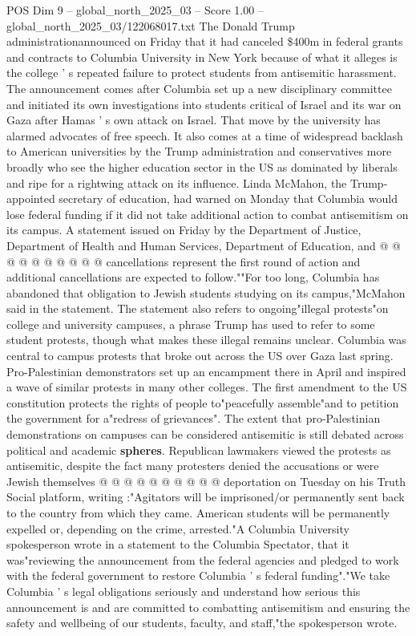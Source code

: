 \begin{textsample}{POS Dim 9 – global\_north\_2025\_03 – Score 1.00 – global\_north\_2025\_03/122068017.txt}  \label{ex:f9_pos_387}
The Donald Trump administrationannounced on Friday that it had canceled \$400m in federal grants and contracts to Columbia University in New York because of what it alleges is the college ' s repeated failure to protect students from antisemitic harassment.
The announcement comes after Columbia set up a new disciplinary committee and initiated its own investigations into students critical of Israel and its war on Gaza after Hamas ' s own attack on Israel.
That move by the university has alarmed advocates of free speech.
It also comes at a time of widespread backlash to American universities by the Trump administration and conservatives more broadly who see the higher education sector in the US as dominated by liberals and ripe for a rightwing attack on its influence.
Linda McMahon, the Trump-appointed secretary of education, had warned on Monday that Columbia would lose federal funding if it did not take additional action to combat antisemitism on its campus.
A statement issued on Friday by the Department of Justice, Department of Health and Human Services, Department of Education, and @ @ @ @ @ @ @ @ @ @ cancellations represent the first round of action and additional cancellations are expected to follow.""For too long, Columbia has abandoned that obligation to Jewish students studying on its campus,"McMahon said in the statement.
The statement also refers to ongoing"illegal protests"on college and university campuses, a phrase Trump has used to refer to some student protests, though what makes these illegal remains unclear.
Columbia was central to campus protests that broke out across the US over Gaza last spring.
Pro-Palestinian demonstrators set up an encampment there in April and inspired a wave of similar protests in many other colleges.
The first amendment to the US constitution protects the rights of people to"peacefully assemble"and to petition the government for a"redress of grievances".
The extent that pro-Palestinian demonstrations on campuses can be considered antisemitic is still debated across political and academic \textbf{spheres}.
Republican lawmakers viewed the protests as antisemitic, despite the fact many protesters denied the accusations or were Jewish themselves @ @ @ @ @ @ @ @ @ @ deportation on Tuesday on his Truth Social platform, writing :"Agitators will be imprisoned/or permanently sent back to the country from which they came.
American students will be permanently expelled or, depending on the crime, arrested."A Columbia University spokesperson wrote in a statement to the Columbia Spectator, that it was"reviewing the announcement from the federal agencies and pledged to work with the federal government to restore Columbia ' s federal funding"."We take Columbia ' s legal obligations seriously and understand how serious this announcement is and are committed to combatting antisemitism and ensuring the safety and wellbeing of our students, faculty, and staff,"the spokesperson wrote.

\end{textsample}
